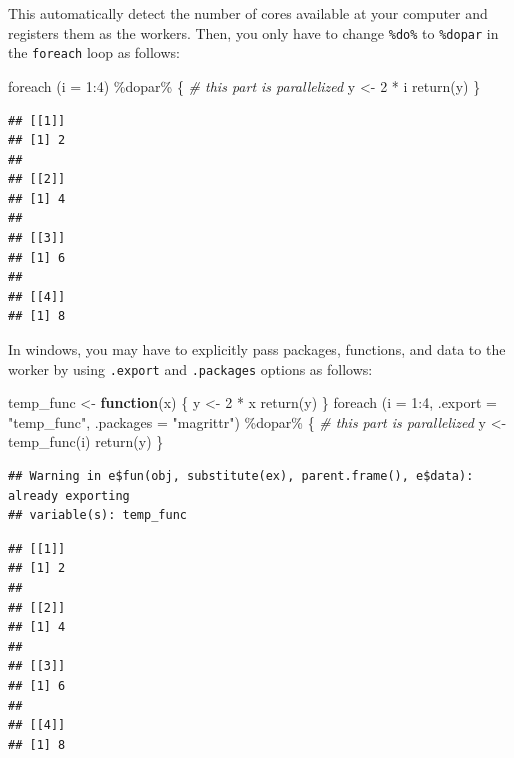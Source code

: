 \documentclass[
]{book}
\newenvironment{Shaded}{\begin{snugshade}}{\end{snugshade}}
\newcommand{\AttributeTok}[1]{\textcolor[rgb]{0.77,0.63,0.00}{#1}}
\newcommand{\CommentTok}[1]{\textcolor[rgb]{0.56,0.35,0.01}{\textit{#1}}}
\newcommand{\ControlFlowTok}[1]{\textcolor[rgb]{0.13,0.29,0.53}{\textbf{#1}}}
\newcommand{\DecValTok}[1]{\textcolor[rgb]{0.00,0.00,0.81}{#1}}
\newcommand{\FunctionTok}[1]{\textcolor[rgb]{0.00,0.00,0.00}{#1}}
\newcommand{\NormalTok}[1]{#1}
\newcommand{\OtherTok}[1]{\textcolor[rgb]{0.56,0.35,0.01}{#1}}
\newcommand{\SpecialCharTok}[1]{\textcolor[rgb]{0.00,0.00,0.00}{#1}}
\newcommand{\StringTok}[1]{\textcolor[rgb]{0.31,0.60,0.02}{#1}}
\begin{document}
This automatically detect the number of cores available at your computer and registers them as the workers. Then, you only have to change \texttt{\%do\%} to \texttt{\%dopar} in the \texttt{foreach} loop as follows:

\begin{Shaded}
\begin{Highlighting}[]
\FunctionTok{foreach}\NormalTok{ (}\AttributeTok{i =} \DecValTok{1}\SpecialCharTok{:}\DecValTok{4}\NormalTok{) }\SpecialCharTok{\%dopar\%}\NormalTok{ \{}
  \CommentTok{\# this part is parallelized}
\NormalTok{  y }\OtherTok{\textless{}{-}} \DecValTok{2} \SpecialCharTok{*}\NormalTok{ i}
  \FunctionTok{return}\NormalTok{(y)}
\NormalTok{\}}
\end{Highlighting}
\end{Shaded}

\begin{verbatim}
## [[1]]
## [1] 2
## 
## [[2]]
## [1] 4
## 
## [[3]]
## [1] 6
## 
## [[4]]
## [1] 8
\end{verbatim}

In windows, you may have to explicitly pass packages, functions, and data to the worker by using \texttt{.export} and \texttt{.packages} options as follows:

\begin{Shaded}
\begin{Highlighting}[]
\NormalTok{temp\_func }\OtherTok{\textless{}{-}} \ControlFlowTok{function}\NormalTok{(x) \{}
\NormalTok{  y }\OtherTok{\textless{}{-}} \DecValTok{2} \SpecialCharTok{*}\NormalTok{ x}
  \FunctionTok{return}\NormalTok{(y)}
\NormalTok{\}}
\FunctionTok{foreach}\NormalTok{ (}\AttributeTok{i =} \DecValTok{1}\SpecialCharTok{:}\DecValTok{4}\NormalTok{, }
         \AttributeTok{.export =} \StringTok{"temp\_func"}\NormalTok{,}
         \AttributeTok{.packages =} \StringTok{"magrittr"}\NormalTok{) }\SpecialCharTok{\%dopar\%}\NormalTok{ \{}
  \CommentTok{\# this part is parallelized}
\NormalTok{  y }\OtherTok{\textless{}{-}} \FunctionTok{temp\_func}\NormalTok{(i)}
  \FunctionTok{return}\NormalTok{(y)}
\NormalTok{\}}
\end{Highlighting}
\end{Shaded}

\begin{verbatim}
## Warning in e$fun(obj, substitute(ex), parent.frame(), e$data): already exporting
## variable(s): temp_func
\end{verbatim}

\begin{verbatim}
## [[1]]
## [1] 2
## 
## [[2]]
## [1] 4
## 
## [[3]]
## [1] 6
## 
## [[4]]
## [1] 8
\end{verbatim}
\end{document}
